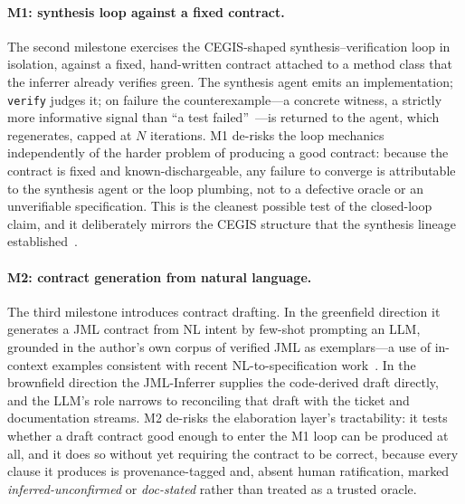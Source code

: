 \paragraph{M1: synthesis loop against a fixed contract.} The second milestone exercises the CEGIS-shaped synthesis--verification loop in isolation, against a fixed, hand-written contract attached to a method class that the inferrer already verifies green. The synthesis agent emits an implementation; \texttt{verify} judges it; on failure the counterexample---a concrete witness, a strictly more informative signal than ``a test failed''~\cite{barr2015oracle}---is returned to the agent, which regenerates, capped at $N$ iterations. M1 de-risks the loop mechanics independently of the harder problem of producing a good contract: because the contract is fixed and known-dischargeable, any failure to converge is attributable to the synthesis agent or the loop plumbing, not to a defective oracle or an unverifiable specification. This is the cleanest possible test of the closed-loop claim, and it deliberately mirrors the CEGIS structure that the synthesis lineage established~\cite{solarlezama2008sketching,alur2013sygus}.

\paragraph{M2: contract generation from natural language.} The third milestone introduces contract drafting. In the greenfield direction it generates a JML contract from NL intent by few-shot prompting an LLM, grounded in the author's own corpus of verified JML as exemplars---a use of in-context examples consistent with recent NL-to-specification work~\cite{endres2024nl2postcond,ma2025specgen,cosler2023nl2spec}. In the brownfield direction the JML-Inferrer supplies the code-derived draft directly, and the LLM's role narrows to reconciling that draft with the ticket and documentation streams. M2 de-risks the elaboration layer's tractability: it tests whether a draft contract good enough to enter the M1 loop can be produced at all, and it does so without yet requiring the contract to be correct, because every clause it produces is provenance-tagged and, absent human ratification, marked \emph{inferred-unconfirmed} or \emph{doc-stated} rather than treated as a trusted oracle.

